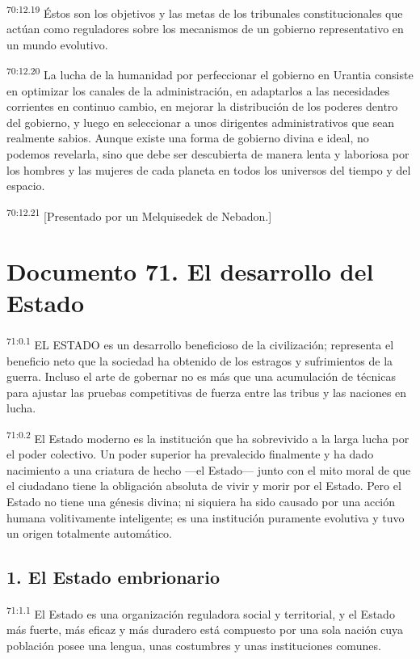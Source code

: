 \documentclass[twoside, 11pt]{book}
\begin{document}
\par
\textsuperscript{70:12.19} Éstos son los objetivos y las metas de los tribunales constitucionales que actúan como reguladores sobre los mecanismos de un gobierno representativo en un mundo evolutivo.

\par
\textsuperscript{70:12.20} La lucha de la humanidad por perfeccionar el gobierno en Urantia consiste en optimizar los canales de la administración, en adaptarlos a las necesidades corrientes en continuo cambio, en mejorar la distribución de los poderes dentro del gobierno, y luego en seleccionar a unos dirigentes administrativos que sean realmente sabios. Aunque existe una forma de gobierno divina e ideal, no podemos revelarla, sino que debe ser descubierta de manera lenta y laboriosa por los hombres y las mujeres de cada planeta en todos los universos del tiempo y del espacio.

\par
\textsuperscript{70:12.21} [Presentado por un Melquisedek de Nebadon.]


\chapter{Documento 71. El desarrollo del Estado}
\par
\textsuperscript{71:0.1} EL ESTADO es un desarrollo beneficioso de la civilización; representa el beneficio neto que la sociedad ha obtenido de los estragos y sufrimientos de la guerra. Incluso el arte de gobernar no es más que una acumulación de técnicas para ajustar las pruebas competitivas de fuerza entre las tribus y las naciones en lucha.

\par
\textsuperscript{71:0.2} El Estado moderno es la institución que ha sobrevivido a la larga lucha por el poder colectivo. Un poder superior ha prevalecido finalmente y ha dado nacimiento a una criatura de hecho ---el Estado--- junto con el mito moral de que el ciudadano tiene la obligación absoluta de vivir y morir por el Estado. Pero el Estado no tiene una génesis divina; ni siquiera ha sido causado por una acción humana volitivamente inteligente; es una institución puramente evolutiva y tuvo un origen totalmente automático.

\section*{1. El Estado embrionario}
\par
\textsuperscript{71:1.1} El Estado es una organización reguladora social y territorial, y el Estado más fuerte, más eficaz y más duradero está compuesto por una sola nación cuya población posee una lengua, unas costumbres y unas instituciones comunes.
\end{document}
